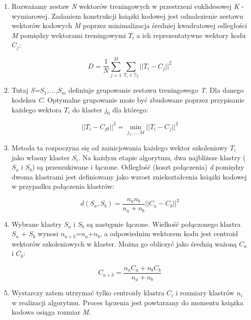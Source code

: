 \documentclass{article}
\begin{document}
\begin{enumerate}
 \item Rozważamy zestaw \textit{N} wektorów treningowych w przestrzeni euklidesowej \textit{K} - wymiarowej. Zadaniem konstrukcji książki kodowej jest odnalezienie zestawu wektorów kodowych \textit{M} poprzez minimalizacja średniej kwadratowej odległości \textit{M} pomiędzy wektorami treningowymi $T_{i}$ a ich
reprezentatywne wektory kodu $C_{j}$:

\begin{equation}
D = \frac{1}{N} \sum_{j=1}^M \sum_{T_{i}\in\mathbb{S_{j}}} ||T_{i} - C_{j}||^2
\end{equation}

\item Tutaj \textit{S={$S_{1}$,...,$S_{m}$}} definiuje grupowanie zestawu treningowego \textit{T}. Dla danego kodeksu \textit{C}. Optymalne grupowanie może być zbudowane poprzez przypisanie każdego wektora \textit{$T_{i}$} do klaster \textit{$j_{0}$} dla którego:

\begin{equation}
||T_{i} - C_{j0}||^2 = \displaystyle \min_{j_1,\dots ,M} ||T_{i} - C_{j}||^2
\end{equation}

\item Metoda ta rozpoczyna się od zainicjowania każdego wektor szkoleniowy \textit{$T_{i}$} jako własny klaster \textit{$S_{i}$}. Na każdym etapie algorytmu, dwa najbliższe klastry (\textit{$S_{a}$} i \textit{$S_{b}$}) są przeszukiwane i łączone. Odległość (koszt połączenia) \textit{d} pomiędzy dwoma klastrami jest definiowany jako wzrost zniekształcenia książki kodowej w przypadku połączenia klastrów:

\begin{equation}
d(S_{a}, S_{b}) = \frac{n_{a}n_{b}}{n_{a} + n_{b}} || C_{a} - C_{b} ||^2
\end{equation}

\item Wybrane klastry \textit{$S_{a}$} i \textit{$S_{b}$} są następnie łączone. Wielkość połączonego klastra \textit{$S_{a}$} + \textit{$S_{b}$} wynosi $n_{a+b}$=$n_{a}$+$n_{b}$, a odpowiednim wektorem kodu jest centroid wektorów szkoleniowych w klaster. Można go obliczyć jako średnią ważoną $C_{a}$ i $C_{b}$:

\begin{equation}
C_{a + b} = \frac{n_{a}C_{a} + n_{b}C_{b}}{n_{a} + n_{b}}
\end{equation}

\item Wystarczy zatem utrzymać tylko centroidy klastra $C_{i}$ i rozmiary klastrów $n_{i}$ w realizacji algorytmu. Proces łączenia jest powtarzany do momentu książka kodowa osiąga rozmiar \textit{M}. 

\end{enumerate}
\end{document}
